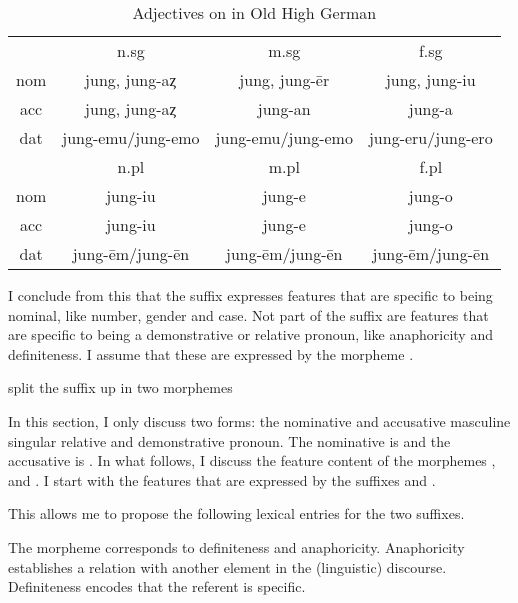 \begin{table}[htbp]
 \center
 \caption {Adjectives on  in Old High German }
  \begin{tabular}{cccc}
  \toprule
            & \ac{n}.\ac{sg}    & \ac{m}.\ac{sg}      & \ac{f}.\ac{sg}    \\
    \cmidrule{2-4}
  \ac{nom}  & jung, jung-aȥ     & jung, jung-ēr       & jung, jung-iu     \\
  \ac{acc}  & jung, jung-aȥ     & jung-an             & jung-a            \\
  \ac{dat}  & jung-emu/jung-emo & jung-emu/jung-emo   & jung-eru/jung-ero \\
  \bottomrule
            & \ac{n}.\ac{pl}    & \ac{m}.\ac{pl}      &  \ac{f}.\ac{pl}   \\
      \cmidrule{2-4}
  \ac{nom}  & jung-iu           &  jung-e             & jung-o            \\
  \ac{acc}  & jung-iu           &  jung-e             & jung-o            \\
  \ac{dat}  & jung-ēm/jung-ēn   &  jung-ēm/jung-ēn    & jung-ēm/jung-ēn   \\
    \bottomrule
  \end{tabular}
  \label{tbl:adj-ohg}
\end{table}

I conclude from this that the suffix expresses features that are specific to being nominal, like number, gender and case. Not part of the suffix are features that are specific to being a demonstrative or relative pronoun, like anaphoricity and definiteness. I assume that these are expressed by the morpheme .

split the suffix up in two morphemes


In this section, I only discuss two forms: the nominative and accusative masculine singular relative and demonstrative pronoun. The nominative is  and the accusative is . In what follows, I discuss the feature content of the morphemes ,  and . I start with the features that are expressed by the suffixes  and .

This allows me to propose the following lexical entries for the two suffixes.



The  morpheme corresponds to definiteness and anaphoricity. Anaphoricity establishes a relation with another element in the (linguistic) discourse. Definiteness encodes that the referent is specific.


